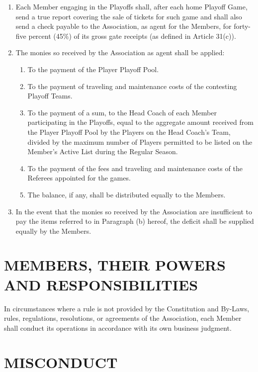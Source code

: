 \documentclass[]{book}
\providecommand{\tightlist}{%
  \setlength{\itemsep}{0pt}\setlength{\parskip}{0pt}}
\theoremstyle{definition}
\theoremstyle{definition}
\theoremstyle{definition}
\theoremstyle{remark}
\begin{document}
\begin{enumerate}
\def\labelenumi{(\alph{enumi})}
\tightlist
\item
  Each Member engaging in the Playoffs shall, after each home Playoff
  Game, send a true report covering the sale of tickets for such game
  and shall also send a check payable to the Association, as agent for
  the Members, for forty-five percent (45\%) of its gross gate receipts
  (as defined in Article 31(c)).
\item
  The monies so received by the Association as agent shall be applied:

  \begin{enumerate}
  \def\labelenumii{(\roman{enumii})}
  \tightlist
  \item
    To the payment of the Player Playoff Pool.
  \item
    To the payment of traveling and maintenance costs of the contesting
    Playoff Teams.
  \item
    To the payment of a sum, to the Head Coach of each Member
    participating in the Playoffs, equal to the aggregate amount
    received from the Player Playoff Pool by the Players on the Head
    Coach's Team, divided by the maximum number of Players permitted to
    be listed on the Member's Active List during the Regular Season.
  \item
    To the payment of the fees and traveling and maintenance costs of
    the Referees appointed for the games.
  \item
    The balance, if any, shall be distributed equally to the Members.
  \end{enumerate}
\item
  In the event that the monies so received by the Association are
  insufficient to pay the items referred to in Paragraph (b) hereof, the
  deficit shall be supplied equally by the Members.
\end{enumerate}

\section{MEMBERS, THEIR POWERS AND
RESPONSIBILITIES}\label{members-their-powers-and-responsibilities}

In circumstances where a rule is not provided by the Constitution and
By-Laws, rules, regulations, resolutions, or agreements of the
Association, each Member shall conduct its operations in accordance with
its own business judgment.

\section{MISCONDUCT}\label{misconduct}
\end{document}
